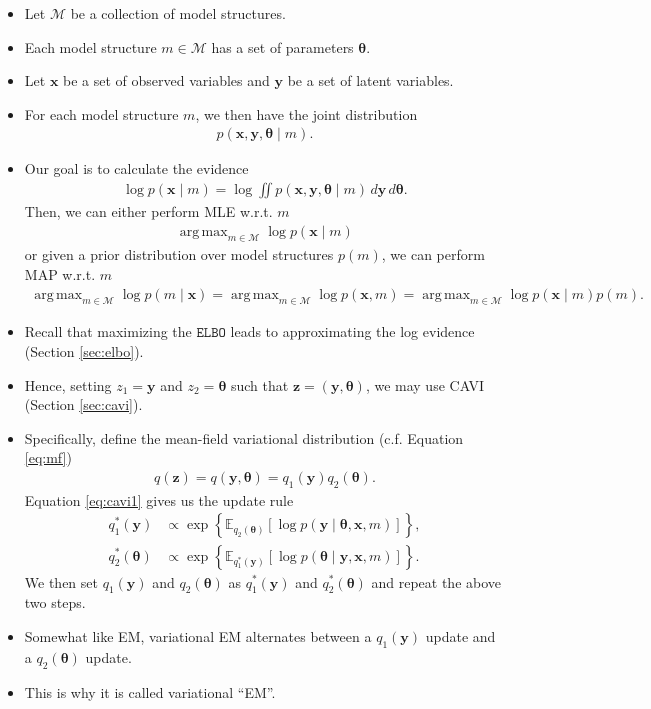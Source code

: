 \documentclass[10pt]{article}
\newcommand{\EE}{\mathbb{E}}
\newcommand{\MM}{\mathcal{M}}
\newcommand{\elbo}{\texttt{ELBO}}
\DeclareMathOperator*{\argmax}{arg\,max}
\begin{document}
\begin{itemize}
\item Let $\MM$ be a collection of model structures.
\item Each model structure $m \in \MM$ has a set of parameters $\bm{\theta}$.
\item Let $\bm{x}$ be a set of observed variables and $\bm{y}$ be a set of latent variables.
\item For each model structure $m$, we then have the joint distribution
\begin{align*}
p(\bm{x}, \bm{y}, \bm{\theta} \mid m).
\end{align*}
\item Our goal is to calculate the evidence
\begin{align*}
\log p(\bm{x} \mid m) = \log \iint p(\bm{x}, \bm{y}, \bm{\theta} \mid m) \, d\bm{y} \, d\bm{\theta}.
\end{align*}
Then, we can either perform MLE w.r.t. $m$
\begin{align*}
\argmax_{m \in \MM} \log p(\bm{x} \mid m)
\end{align*}
or given a prior distribution over model structures $p(m)$, we can perform MAP w.r.t. $m$
\begin{align*}
\argmax_{m \in \MM} \log p(m \mid \bm{x}) = \argmax_{m \in \MM} \log p(\bm{x},m) = \argmax_{m \in \MM} \log p(\bm{x} \mid m) p(m).
\end{align*}
\item Recall that maximizing the $\elbo$ leads to approximating the log evidence (Section \ref{sec:elbo}).
\item Hence, setting $z_1 = \bm{y}$ and $z_2 = \bm{\theta}$ such that $\bm{z} = (\bm{y},\bm{\theta})$, we may use CAVI (Section \ref{sec:cavi}).
\item Specifically, define the mean-field variational distribution (c.f. Equation \eqref{eq:mf})
\begin{align*}
q(\bm{z}) = q(\bm{y},\bm{\theta}) = q_1(\bm{y}) q_2(\bm{\theta}).
\end{align*}
Equation \eqref{eq:cavi1} gives us the update rule
\begin{align*}
q_1^*(\bm{y}) &\propto \exp\left\{ \EE_{q_2(\bm{\theta})}[\log p(\bm{y} \mid \bm{\theta}, \bm{x}, m)] \right\}, \\
q_2^*(\bm{\theta}) &\propto \exp\left\{ \EE_{q_1^*(\bm{y})}[\log p(\bm{\theta} \mid \bm{y}, \bm{x}, m)] \right\}.
\end{align*}
We then set $q_1(\bm{y})$ and $q_2(\bm{\theta})$ as $q_1^*(\bm{y})$ and $q_2^*(\bm{\theta})$ and repeat the above two steps.
\item Somewhat like EM, variational EM alternates between a $q_1(\bm{y})$ update and a $q_2(\bm{\theta})$ update.
\item This is why it is called variational \enquote{EM}.
\end{itemize}
\end{document}
